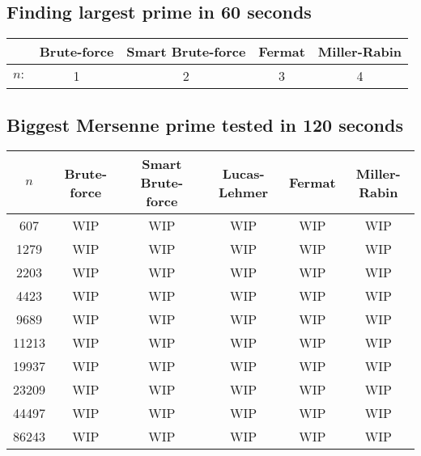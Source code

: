 \documentclass[main.tex]{subfiles}
\begin{document}
\subsection{Finding largest prime in 60 seconds}

\begin{table}[ht!]
  \centering
  \begin{tabular}{||c c c c c||}
    \hline
    & Brute-force & Smart Brute-force & Fermat & Miller-Rabin \\ [0.5ex] 
    \hline\hline
    $n:$ & 1 & 2 & 3 & 4\\   [1ex] 
    \hline
  \end{tabular}
\end{table}

\subsection{Biggest Mersenne prime tested in 120 seconds}

\begin{table}[ht!]
  \centering
  \begin{tabular}{||c c c c c c||}
    \hline
    $n$ & Brute-force & Smart Brute-force & Lucas-Lehmer & Fermat & Miller-Rabin  \\ [0.5ex] 
    \hline\hline
    607 & WIP & WIP & WIP & WIP & WIP\\
    1279 & WIP & WIP & WIP & WIP & WIP\\
    2203 & WIP & WIP & WIP & WIP & WIP\\
    4423 & WIP & WIP & WIP & WIP & WIP\\
    9689 & WIP & WIP & WIP & WIP & WIP\\
    11213 & WIP & WIP & WIP & WIP & WIP\\
    19937 & WIP & WIP & WIP & WIP & WIP\\
    23209 & WIP & WIP & WIP & WIP & WIP\\  [1ex] 
    44497 & WIP & WIP & WIP & WIP & WIP\\  [1ex] 
    86243 & WIP & WIP & WIP & WIP & WIP\\  [1ex] 
    \hline
  \end{tabular}
\end{table}
\end{document}

